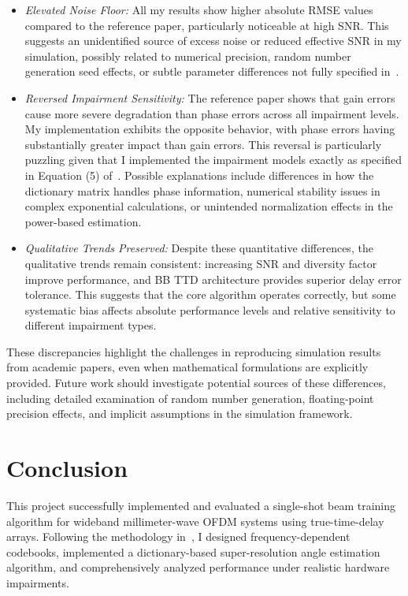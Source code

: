 \documentclass[12pt,letterpaper]{article}
\begin{document}
\begin{itemize}
    \item \textit{Elevated Noise Floor:} All my results show higher absolute RMSE values compared to the reference paper, particularly noticeable at high SNR. This suggests an unidentified source of excess noise or reduced effective SNR in my simulation, possibly related to numerical precision, random number generation seed effects, or subtle parameter differences not fully specified in~\cite{boljanovic2020design}.

    \item \textit{Reversed Impairment Sensitivity:} The reference paper shows that gain errors cause more severe degradation than phase errors across all impairment levels. My implementation exhibits the opposite behavior, with phase errors having substantially greater impact than gain errors. This reversal is particularly puzzling given that I implemented the impairment models exactly as specified in Equation (5) of~\cite{boljanovic2020design}. Possible explanations include differences in how the dictionary matrix handles phase information, numerical stability issues in complex exponential calculations, or unintended normalization effects in the power-based estimation.

    \item \textit{Qualitative Trends Preserved:} Despite these quantitative differences, the qualitative trends remain consistent: increasing SNR and diversity factor improve performance, and BB TTD architecture provides superior delay error tolerance. This suggests that the core algorithm operates correctly, but some systematic bias affects absolute performance levels and relative sensitivity to different impairment types.
\end{itemize}

These discrepancies highlight the challenges in reproducing simulation results from academic papers, even when mathematical formulations are explicitly provided. Future work should investigate potential sources of these differences, including detailed examination of random number generation, floating-point precision effects, and implicit assumptions in the simulation framework.

\section{Conclusion}

This project successfully implemented and evaluated a single-shot beam training algorithm for wideband millimeter-wave OFDM systems using true-time-delay arrays. Following the methodology in~\cite{boljanovic2020design}, I designed frequency-dependent codebooks, implemented a dictionary-based super-resolution angle estimation algorithm, and comprehensively analyzed performance under realistic hardware impairments.
\end{document}
